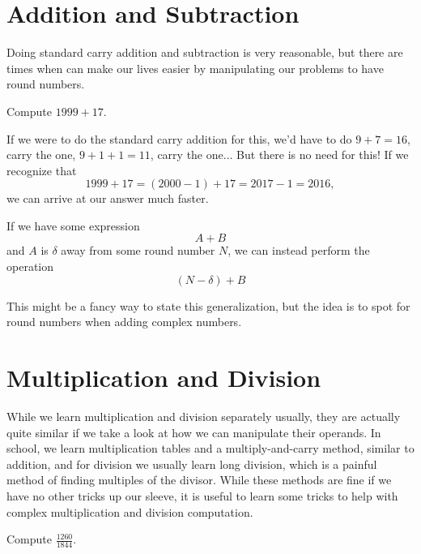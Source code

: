 \section{Addition and Subtraction}

Doing standard carry addition and subtraction is very reasonable, but there are times when can make our lives easier by manipulating our problems to have round numbers.

\begin{example}
  Compute $1999 + 17$.
\end{example}

If we were to do the standard carry addition for this, we'd have to do $9 + 7 = 16$, carry the one, $9 + 1 + 1 = 11$, carry the one...
But there is no need for this! If we recognize that
\begin{equation*}
  1999 + 17 = (2000 - 1) + 17 = 2017 -1 = 2016,
\end{equation*}
we can arrive at our answer much faster.

\begin{theorem}
  If we have some expression
  \begin{equation}
    A + B
  \end{equation}
  and $A$ is $\delta$ away from some round number $N$, we can instead perform the operation
  \begin{equation}
    (N - \delta) + B
  \end{equation}
\end{theorem}

This might be a fancy way to state this generalization, but the idea is to spot for round numbers when adding complex numbers.

\section{Multiplication and Division}

While we learn multiplication and division separately usually, they are actually quite similar if we take a look at how we can manipulate their operands.
In school, we learn multiplication tables and a multiply-and-carry method, similar to addition, and for division we usually learn long division, which is a painful method of finding multiples of the divisor.
While these methods are fine if we have no other tricks up our sleeve, it is useful to learn some tricks to help with complex multiplication and division computation.

\begin{example}
  Compute $\frac{1260}{1844}$.
  \label{ex:factoring}
\end{example}

